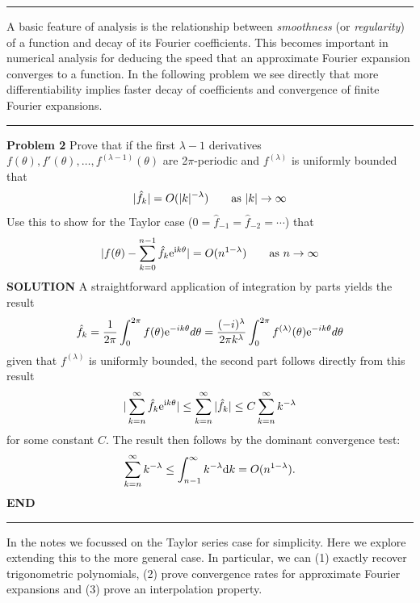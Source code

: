 \documentclass[12pt,a4paper]{article}
\begin{document}
\rule{\textwidth}{1pt}
A basic feature of analysis is the relationship between \emph{smoothness} (or \emph{regularity}) of a function and decay of its Fourier coefficients. This becomes important in numerical analysis for deducing the speed that an approximate Fourier expansion  converges to a function. In the following problem we see directly that more differentiability implies faster decay of coefficients and convergence of finite Fourier expansions.

\rule{\textwidth}{1pt}
\textbf{Problem 2} Prove that if the first $\ensuremath{\lambda}-1$ derivatives $f(\ensuremath{\theta}), f'(\ensuremath{\theta}), \ensuremath{\ldots}, f^{(\ensuremath{\lambda}-1)}(\ensuremath{\theta})$ are 2\ensuremath{\pi}-periodic and $f^{(\ensuremath{\lambda})}$ is uniformly bounded  that
\[
|\hat f_k| = O(|k|^{-\ensuremath{\lambda}})\qquad \hbox{as $|k| \ensuremath{\rightarrow} \ensuremath{\infty}$}
\]
Use this to show for the Taylor case ($0 = \hat f_{-1} = \hat f_{-2} = \ensuremath{\cdots}$) that
\[
|f(\ensuremath{\theta}) - \ensuremath{\sum}_{k=0}^{n-1} \hat f_k {\rm e}^{{\rm i}k\ensuremath{\theta}}| = O(n^{1-\ensuremath{\lambda}})\qquad \hbox{as $n \ensuremath{\rightarrow} \ensuremath{\infty}$}
\]
\textbf{SOLUTION} A straightforward application of integration by parts yields the result
\[
\hat f_k = \frac{1}{2\ensuremath{\pi}} \int^{2\ensuremath{\pi}}_{0} f(\ensuremath{\theta}) {\rm e}^{-ik\ensuremath{\theta}} d\ensuremath{\theta} = \frac{(-i)^\ensuremath{\lambda}}{2\ensuremath{\pi} k^{\ensuremath{\lambda}}} \int^{2\ensuremath{\pi}}_{0} f^{(\ensuremath{\lambda})}(\ensuremath{\theta}) {\rm e}^{-ik\ensuremath{\theta}} d\ensuremath{\theta}
\]
given that $f^{(\ensuremath{\lambda})}$ is uniformly bounded, the second part follows directly from this result
\[
|\ensuremath{\sum}_{k=n}^{\ensuremath{\infty}} \hat f_k {\rm e}^{{\rm i}k\ensuremath{\theta}}| \ensuremath{\leq} \ensuremath{\sum}_{k=n}^{\ensuremath{\infty}} |\hat f_k | \ensuremath{\leq} C \ensuremath{\sum}_{k=n}^{\ensuremath{\infty}} k^{-\ensuremath{\lambda}}
\]
for some constant $C$. The result then follows by the dominant convergence test:
\[
\ensuremath{\sum}_{k=n}^{\ensuremath{\infty}} k^{-\ensuremath{\lambda}} \ensuremath{\leq} \int_{n-1}^\ensuremath{\infty} k^{-\ensuremath{\lambda}} {\rm d}k = O(n^{1-\ensuremath{\lambda}}).
\]
\textbf{END}

\rule{\textwidth}{1pt}
In the notes we focussed on the Taylor series case for simplicity. Here we explore extending this to the more general case.  In particular, we can (1) exactly recover trigonometric polynomials, (2) prove convergence rates for approximate Fourier expansions and (3) prove an interpolation property.
\end{document}
